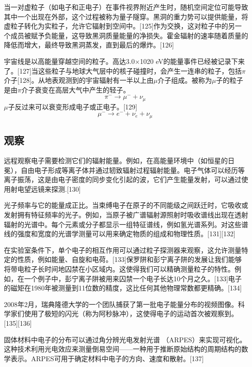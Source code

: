 当一对虚粒子（如电子和正电子）在事件视界附近产生时，随机空间定位可能导致其中一个出现在外部，这个过程被称为量子隧穿。黑洞的重力势可以提供能量，将虚粒子转化为实粒子，允许它辐射到空间中。[125]作为交换，这对粒子中的另一个成员被赋予负能量，这导致黑洞质量能量的净损失。霍金辐射的速率随着质量的降低而增大，最终导致黑洞蒸发，直到最后的爆炸。[126]

宇宙线是以高能量穿越空间的粒子。高达3.0×1020 eV的能量事件已经被记录下来了。[127]当这些粒子与地球大气层中的核子碰撞时，会产生一连串的粒子，包括$\pi$介子[128]。从地表观测到的宇宙辐射有一半以上由$\mu$介子组成。被称为$\mu$子的粒子是由$\pi$介子衰变在高层大气中产生的轻子。
$$\pi^- \to \mu^- +\nu_\mu~$$
$\mu$子反过来可以衰变形成电子或正电子。[129]
$$\mu^- \to e^- +\nu_e +\nu_\mu~$$

\subsection{观察}
远程观察电子需要检测它们的辐射能量。例如，在高能量环境中（如恒星的日冕），自由电子形成等离子体并通过轫致辐射过程辐射能量。电子气体可以经历等离子振荡，这是由电子密度的同步变化引起的波，它们产生能量发射，可以通过使用射电望远镜来探测.[130]

光子频率与它的能量成正比。当束缚电子在原子的不同能级之间跃迁时，它吸收或发射拥有特征频率的光子。例如，当原子被广谱辐射源照射时吸收谱线出现在透射辐射的光谱中。每个元素或分子都显示一组特征谱线，例如氢光谱系列。对这些谱线的强度和宽度的光谱学测量可以用来确定物质的组成和物理性质。[131][132]

在实验室条件下，单个电子的相互作用可以通过粒子探测器来观察，这允许测量特定的性质，例如能量、自旋和电荷。[133]保罗阱和彭宁离子阱的发展让我们能够将带电粒子长时间地囚禁在小区域内。这使得我们可以精确测量粒子的特性。例如，在一个例子中，彭宁离子阱被用来囚禁一个电子长达10个月之久。[133]电子的磁矩在1980年被测量到11位数的精度，这比任何其他物理常数都更精确。[134]

2008年2月，瑞典隆德大学的一个团队捕获了第一批电子能量分布的视频图像。科学家们使用了极短的闪光（称为阿秒脉冲），这使得电子的运动首次被观察到。[135][136]

固体材料中电子的分布可以通过角分辨光电发射光谱 （ARPES）来实现可视化。这种技术利用光电效应来测量倒易空间——一种用于推断原始结构的周期结构的数学表示。ARPES可用于确定材料中电子的方向、速度和散射。[137]